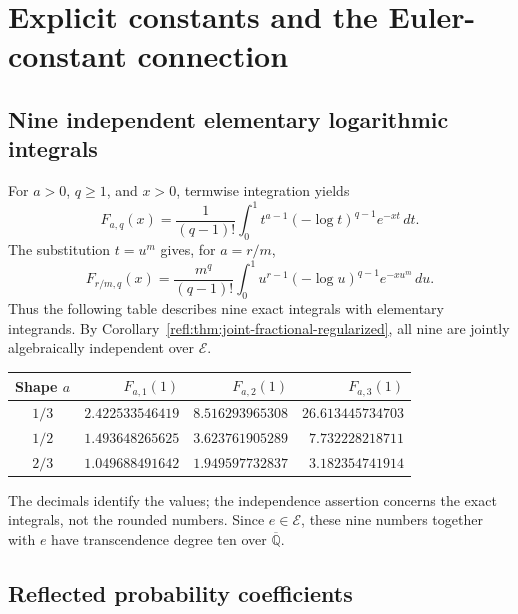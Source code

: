 \documentclass[11pt,a4paper]{article}
\newcommand{\Qbar}{\overline{\mathbb Q}}
\newcommand{\E}{\mathcal E}
\theoremstyle{definition}
\theoremstyle{remark}
\numberwithin{equation}{section}
\begin{document}
\section{Explicit constants and the Euler-constant connection}

\subsection{Nine independent elementary logarithmic integrals}

For $a>0$, $q\geq1$, and $x>0$, termwise integration yields
\begin{equation}\label{refl:eq:log-moment-integral}
 F_{a,q}(x)=\frac1{(q-1)!}
 \int_0^1 t^{a-1}(-\log t)^{q-1}e^{-xt}\,dt.
\end{equation}
The substitution $t=u^m$ gives, for $a=r/m$,
\begin{equation}\label{refl:eq:elementary-integrals}
 F_{r/m,q}(x)=\frac{m^q}{(q-1)!}
 \int_0^1u^{r-1}(-\log u)^{q-1}e^{-xu^m}\,du.
\end{equation}
Thus the following table describes nine exact integrals with elementary
integrands. By Corollary~\ref{refl:thm:joint-fractional-regularized}, all nine
are jointly algebraically independent over $\E$.
\begin{center}
\begin{tabular}{@{}crrr@{}}
\toprule
Shape $a$ & $F_{a,1}(1)$ & $F_{a,2}(1)$ & $F_{a,3}(1)$\\
\midrule
$1/3$ & $2.422533546419$ & $8.516293965308$ & $26.613445734703$\\
$1/2$ & $1.493648265625$ & $3.623761905289$ & $7.732228218711$\\
$2/3$ & $1.049688491642$ & $1.949597732837$ & $3.182354741914$\\
\bottomrule
\end{tabular}
\end{center}
The decimals identify the values; the independence assertion concerns
the exact integrals, not the rounded numbers. Since $e\in\E$,
these nine numbers together with $e$ have transcendence degree ten over
$\Qbar$.

\subsection{Reflected probability coefficients}
\end{document}
